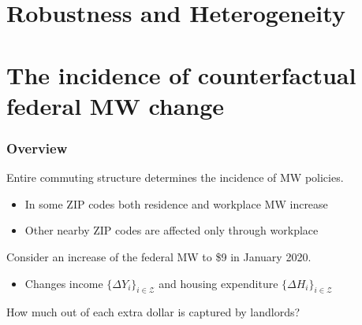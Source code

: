 \documentclass[aspectratio=169, t]{beamer}
\newcommand{\Z}{\mathcal{Z}}
\begin{document}
\section{Robustness and Heterogeneity}

\section{The incidence of counterfactual federal MW change}

\begin{frame}
    \frametitle{Overview}
    
    Entire commuting structure determines the incidence of MW policies.
    \begin{itemize}
    	\vspace{1mm}
    	\item In some ZIP codes both residence and workplace MW increase
    	\vspace{1mm}
    	\item Other nearby ZIP codes are affected only through workplace
    \end{itemize}
    
    \pause
    \vspace{3mm}
    Consider an increase of the federal MW to \$9 in January 2020.
    \begin{itemize}
    	\vspace{1mm}
    	\item Changes income $\{\Delta Y_i\}_{i\in\Z}$ and housing expenditure $\{\Delta H_i\}_{i\in\Z}$
    \end{itemize}
    
    \pause
    \vspace{3mm}
    How much out of each extra dollar is captured by landlords?
   
\end{frame}
\end{document}
